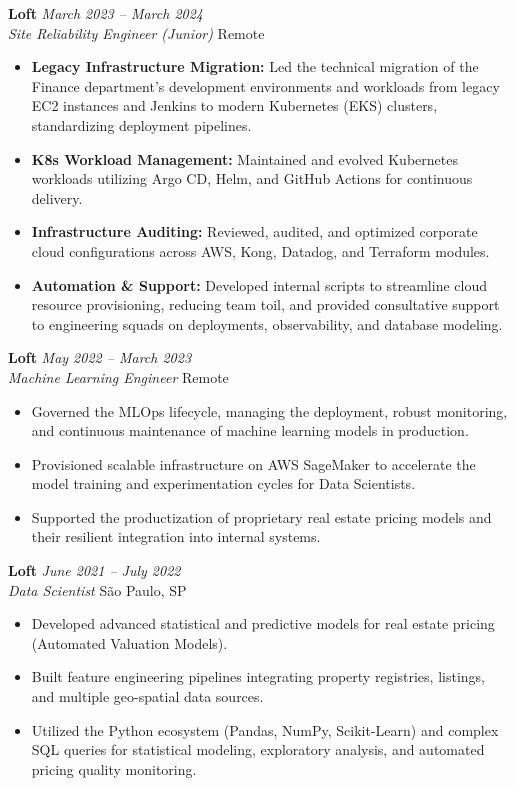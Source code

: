 \documentclass[10pt,a4paper]{article}
\newcommand{\experienceitem}[4]{
  \vspace{4pt}
  {\bfseries\color{textdark}#1} \hfill {\em #2} \\
  {\itshape\color{secondary}#3} \hfill {\small\color{gray}#4} \\[2pt]
}
\begin{document}
\experienceitem{Loft}{March 2023 -- March 2024}{Site Reliability Engineer (Junior)}{Remote}
\begin{itemize}[leftmargin=*, noitemsep, topsep=2pt]
    \item \textbf{Legacy Infrastructure Migration:} Led the technical migration of the Finance department's development environments and workloads from legacy EC2 instances and Jenkins to modern Kubernetes (EKS) clusters, standardizing deployment pipelines.
    \item \textbf{K8s Workload Management:} Maintained and evolved Kubernetes workloads utilizing Argo CD, Helm, and GitHub Actions for continuous delivery.
    \item \textbf{Infrastructure Auditing:} Reviewed, audited, and optimized corporate cloud configurations across AWS, Kong, Datadog, and Terraform modules.
    \item \textbf{Automation \& Support:} Developed internal scripts to streamline cloud resource provisioning, reducing team toil, and provided consultative support to engineering squads on deployments, observability, and database modeling.
\end{itemize}

\experienceitem{Loft}{May 2022 -- March 2023}{Machine Learning Engineer}{Remote}
\begin{itemize}[leftmargin=*, noitemsep, topsep=2pt]
    \item Governed the MLOps lifecycle, managing the deployment, robust monitoring, and continuous maintenance of machine learning models in production.
    \item Provisioned scalable infrastructure on AWS SageMaker to accelerate the model training and experimentation cycles for Data Scientists.
    \item Supported the productization of proprietary real estate pricing models and their resilient integration into internal systems.
\end{itemize}

\experienceitem{Loft}{June 2021 -- July 2022}{Data Scientist}{São Paulo, SP}
\begin{itemize}[leftmargin=*, noitemsep, topsep=2pt]
    \item Developed advanced statistical and predictive models for real estate pricing (Automated Valuation Models).
    \item Built feature engineering pipelines integrating property registries, listings, and multiple geo-spatial data sources.
    \item Utilized the Python ecosystem (Pandas, NumPy, Scikit-Learn) and complex SQL queries for statistical modeling, exploratory analysis, and automated pricing quality monitoring.
\end{itemize}
\end{document}
